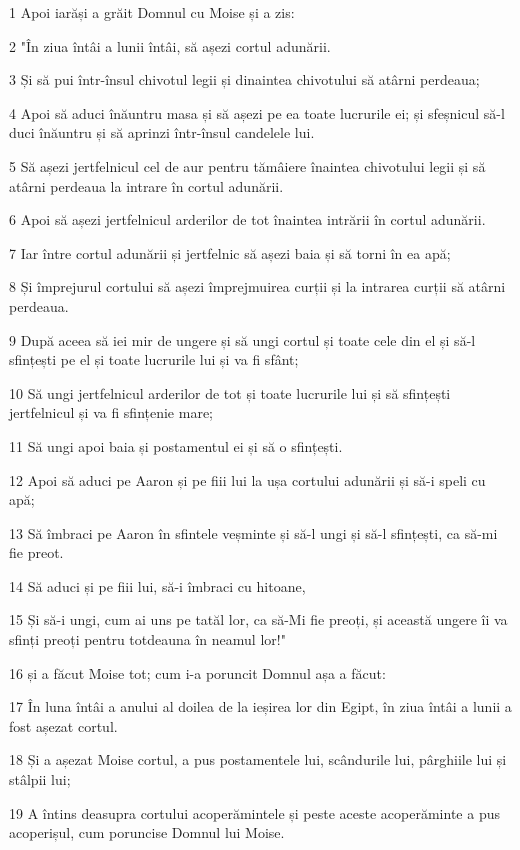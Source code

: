 \par 1 Apoi iarăși a grăit Domnul cu Moise și a zis:
\par 2 "În ziua întâi a lunii întâi, să așezi cortul adunării.
\par 3 Și să pui într-însul chivotul legii și dinaintea chivotului să atârni perdeaua;
\par 4 Apoi să aduci înăuntru masa și să așezi pe ea toate lucrurile ei; și sfeșnicul să-l duci înăuntru și să aprinzi într-însul candelele lui.
\par 5 Să așezi jertfelnicul cel de aur pentru tămâiere înaintea chivotului legii și să atârni perdeaua la intrare în cortul adunării.
\par 6 Apoi să așezi jertfelnicul arderilor de tot înaintea intrării în cortul adunării.
\par 7 Iar între cortul adunării și jertfelnic să așezi baia și să torni în ea apă;
\par 8 Și împrejurul cortului să așezi împrejmuirea curții și la intrarea curții să atârni perdeaua.
\par 9 După aceea să iei mir de ungere și să ungi cortul și toate cele din el și să-l sfințești pe el și toate lucrurile lui și va fi sfânt;
\par 10 Să ungi jertfelnicul arderilor de tot și toate lucrurile lui și să sfințești jertfelnicul și va fi sfințenie mare;
\par 11 Să ungi apoi baia și postamentul ei și să o sfințești.
\par 12 Apoi să aduci pe Aaron și pe fiii lui la ușa cortului adunării și să-i speli cu apă;
\par 13 Să îmbraci pe Aaron în sfintele veșminte și să-l ungi și să-l sfințești, ca să-mi fie preot.
\par 14 Să aduci și pe fiii lui, să-i îmbraci cu hitoane,
\par 15 Și să-i ungi, cum ai uns pe tatăl lor, ca să-Mi fie preoți, și această ungere îi va sfinți preoți pentru totdeauna în neamul lor!"
\par 16 și a făcut Moise tot; cum i-a poruncit Domnul așa a făcut:
\par 17 În luna întâi a anului al doilea de la ieșirea lor din Egipt, în ziua întâi a lunii a fost așezat cortul.
\par 18 Și a așezat Moise cortul, a pus postamentele lui, scândurile lui, pârghiile lui și stâlpii lui;
\par 19 A întins deasupra cortului acoperămintele și peste aceste acoperăminte a pus acoperișul, cum poruncise Domnul lui Moise.

